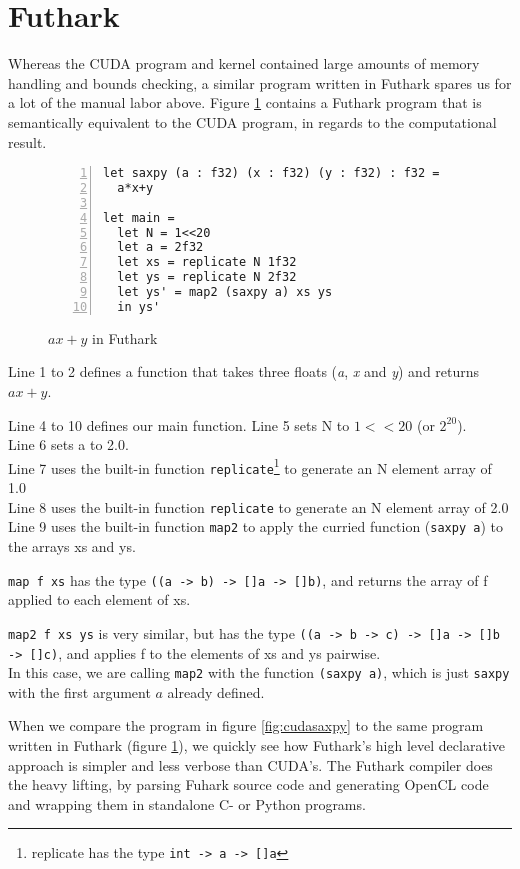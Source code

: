 \section{Futhark}
Whereas the CUDA program and kernel contained large amounts of memory handling
and bounds checking, a similar program written in Futhark spares us for a lot of
the manual labor above. Figure \ref{fig:futsaxpy} contains a Futhark program
that is semantically equivalent to the CUDA program, in regards to the
computational result.
\begin{figure}[H]
  \centering
\begin{lstlisting}[language=Futhark, numbers=left]
let saxpy (a : f32) (x : f32) (y : f32) : f32 =
  a*x+y

let main =
  let N = 1<<20
  let a = 2f32
  let xs = replicate N 1f32
  let ys = replicate N 2f32
  let ys' = map2 (saxpy a) xs ys
  in ys'
  \end{lstlisting}
  \caption{$ax+y$ in Futhark}
  \label{fig:futsaxpy}
\end{figure}

Line 1 to 2 defines a function that takes three floats (\textit{a}, \textit{x}
and \textit{y}) and returns $ax+y$.  

Line 4 to 10 defines our main function.
Line 5 sets N to $1 << 20$ (or $2^{20}$).\\
Line 6 sets a to 2.0.\\
Line 7 uses the built-in function \texttt{replicate}\footnote{replicate has the
  type \texttt{int -> a -> []a}} to generate an N element
array of 1.0\\
Line 8 uses the built-in function \texttt{replicate} to generate an N element array of 2.0\\
Line 9 uses the built-in function \texttt{map2} to apply the curried function
(\texttt{saxpy a}) to the arrays xs and ys.

\texttt{map f xs} has the type \texttt{((a -> b) -> []a -> []b)}, and
returns the array of f applied to each element of xs.

\texttt{map2 f xs ys} is very similar, but has the type \texttt{((a -> b -> c) -> []a -> []b -> []c)}, and
applies f to the elements of xs and ys pairwise.\\
In this case, we are calling \texttt{map2} with the function \texttt{(saxpy a)},
which is just \texttt{saxpy} with the first argument $a$ already defined.

When we compare the program in figure \ref{fig:cudasaxpy} to the same program
written in Futhark (figure \ref{fig:futsaxpy}), we quickly see how Futhark's
high level declarative approach is simpler and less verbose than CUDA's.
The Futhark compiler does the heavy lifting, by parsing Fuhark source code and
generating OpenCL code and wrapping them in standalone C- or Python programs.

